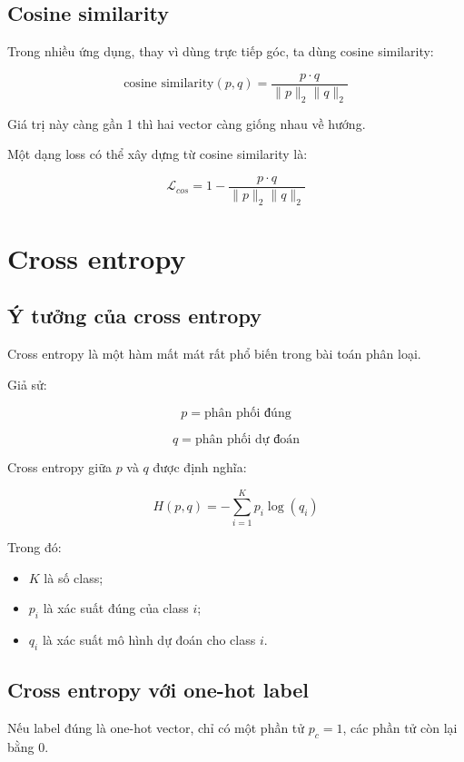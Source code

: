 \subsection{Cosine similarity}

Trong nhiều ứng dụng, thay vì dùng trực tiếp góc, ta dùng cosine similarity:

\[
    \text{cosine similarity}(p,q)
    =
    \frac{p \cdot q}{\|p\|_2\|q\|_2}
\]

Giá trị này càng gần 1 thì hai vector càng giống nhau về hướng.

Một dạng loss có thể xây dựng từ cosine similarity là:

\[
    \mathcal{L}_{cos} = 1 -
    \frac{p \cdot q}{\|p\|_2\|q\|_2}
\]

\section{Cross entropy}

\subsection{Ý tưởng của cross entropy}

Cross entropy là một hàm mất mát rất phổ biến trong bài toán phân loại.

Giả sử:

\[
    p = \text{phân phối đúng}
\]

\[
    q = \text{phân phối dự đoán}
\]

Cross entropy giữa $p$ và $q$ được định nghĩa:

\[
    H(p,q) = -\sum_{i=1}^{K} p_i \log(q_i)
\]

Trong đó:

\begin{itemize}
    \item $K$ là số class;
    \item $p_i$ là xác suất đúng của class $i$;
    \item $q_i$ là xác suất mô hình dự đoán cho class $i$.
\end{itemize}

\subsection{Cross entropy với one-hot label}

Nếu label đúng là one-hot vector, chỉ có một phần tử $p_c=1$, các phần tử còn lại bằng 0.

